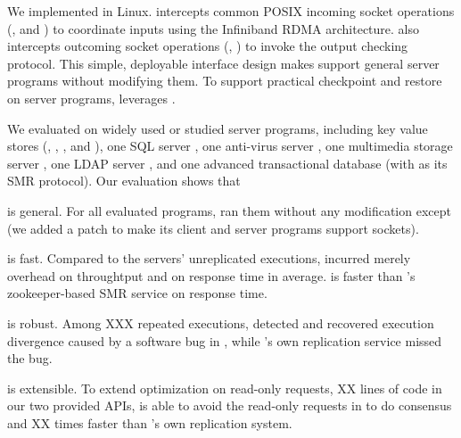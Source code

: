 We implemented \xxx in Linux. \xxx intercepts common POSIX incoming socket 
operations (\eg, \accept and \recv) to coordinate inputs using the Infiniband 
RDMA architecture. \xxx also intercepts outcoming socket operations (\eg, 
\send) to invoke the output checking protocol. This simple, deployable 
interface design makes \xxx support general server programs without modifying 
them. To support practical checkpoint and restore on server 
programs, \xxx leverages \criu.

We evaluated \xxx on \nprog widely used or studied server programs, including 
\nkvprog key value stores (\redis, \memcached, \ssdb, and \mongodb), one SQL 
server \mysql, one anti-virus server \clamav, one multimedia storage server 
\mediatomb, one LDAP server \openldap, and one advanced transactional database 
\calvin (with \zookeeper as its SMR protocol). Our evaluation shows that

\begin{tightenum}
\item \xxx is general. For all evaluated programs, \xxx ran them without any 
modification except \calvin (we added a \nlinescalvin patch to make its client 
and server programs support sockets).

\item \xxx is fast. Compared to the \nprog servers' unreplicated executions, 
\xxx incurred merely \tputoverhead overhead on throughtput and \latencyoverhead 
on response time in average. \xxx is \fasterthanzookeeper faster than \calvin's 
zookeeper-based SMR service on response time.

\item \xxx is robust. Among XXX repeated executions, \xxx detected and 
recovered execution divergence caused by a software bug in \redis, while 
\redis's own replication service missed the bug.

\item \xxx is extensible. To extend optimization on read-only requests, XX 
lines of code in our two provided APIs, \xxx is able to avoid the read-only 
requests in \redis to do consensus and XX times faster than \redis's own 
replication system. 

\end{tightenum}  

